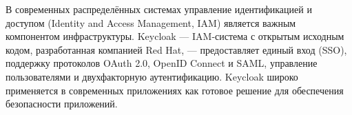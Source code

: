 \documentclass[times]{itmo-student-thesis}
\begin{document}








\tableofcontents

\startprefacepage

В современных распределённых системах управление идентификацией и доступом
(Identity and Access Management, IAM) является важным компонентом
инфраструктуры. Keycloak --- IAM-система с открытым исходным кодом, разработанная
компанией Red Hat, --- предоставляет единый вход (SSO), поддержку протоколов
OAuth 2.0, OpenID Connect и SAML, управление пользователями и двухфакторную
аутентификацию. Keycloak широко применяется в современных приложениях
как готовое решение для обеспечения безопасности приложений.
\end{document}
